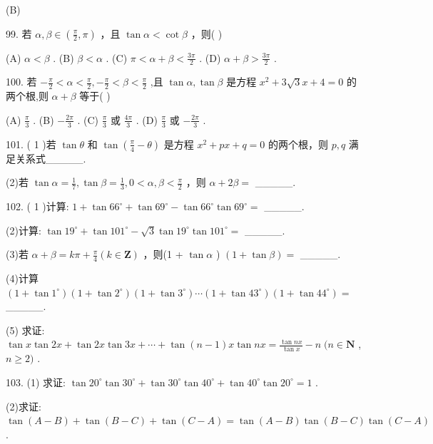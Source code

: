 \documentclass[10pt]{article}
\begin{document}
(B)

99. 若 \(\alpha ,\beta  \in  \left( {\frac{\pi }{2},\pi }\right)\) ，且 \(\tan \alpha  < \cot \beta\) ，则( )

(A) \(\alpha  < \beta\) . (B) \(\beta  < \alpha\) . (C) \(\pi  < \alpha  + \beta  < \frac{3\pi }{2}\) . (D) \(\alpha  + \beta  > \frac{3\pi }{2}\) .

100. 若 \(- \frac{\pi }{2} < \alpha  < \frac{\pi }{2}, - \frac{\pi }{2} < \beta  < \frac{\pi }{2}\) ,且 \(\tan \alpha ,\tan \beta\) 是方程 \({x}^{2} + 3\sqrt{3}x + 4 = 0\) 的两个根,则 \(\alpha  + \beta\) 等于( )

(A) \(\frac{\pi }{3}\) . (B) \(- \frac{2\pi }{3}\) . (C) \(\frac{\pi }{3}\) 或 \(\frac{4\pi }{3}\) . (D) \(\frac{\pi }{3}\) 或 \(- \frac{2\pi }{3}\) .

101. ( 1 )若 \(\tan \theta\) 和 \(\tan \left( {\frac{\pi }{4} - \theta }\right)\) 是方程 \({x}^{2} + {px} + q = 0\) 的两个根，则 \(p,q\) 满足关系式\_\_\_\_\_.

(2)若 \(\tan \alpha  = \frac{1}{7},\tan \beta  = \frac{1}{3},0 < \alpha ,\beta  < \frac{\pi }{2}\) ，则 \(\alpha  + {2\beta } =\) \_\_\_\_\_.

102. ( 1 )计算: \(1 + \tan {66}^{ \circ  } + \tan {69}^{ \circ  } - \tan {66}^{ \circ  }\tan {69}^{ \circ  } =\) \_\_\_\_\_.

(2)计算: \(\tan {19}^{ \circ  } + \tan {101}^{ \circ  } - \sqrt{3}\tan {19}^{ \circ  }\tan {101}^{ \circ  } =\) \_\_\_\_\_.

(3)若 \(\alpha  + \beta  = {k\pi } + \frac{\pi }{4}\left( {k \in  \mathbf{Z}}\right)\) ，则(1 + \(\tan \alpha\) ) \(\left( {1 + \tan \beta }\right)  =\) \_\_\_\_\_.

(4)计算 \(\left( {1 + \tan {1}^{ \circ  }}\right) \left( {1 + \tan {2}^{ \circ  }}\right) \left( {1 + \tan {3}^{ \circ  }}\right) \cdots \left( {1 + \tan {43}^{ \circ  }}\right) \left( {1 + \tan {44}^{ \circ  }}\right)  =\) \_\_\_\_\_.

(5) 求证: \(\tan x\tan {2x} + \tan {2x}\tan {3x} + \cdots  + \tan \left( {n - 1}\right) x\tan {nx} = \frac{\tan {nx}}{\tan x} - n\;(n \in  \mathbf{N}\) , \(n \geq  2)\) .

103. (1) 求证: \(\tan {20}^{ \circ  }\tan {30}^{ \circ  } + \tan {30}^{ \circ  }\tan {40}^{ \circ  } + \tan {40}^{ \circ  }\tan {20}^{ \circ  } = 1\) .

(2)求证: \(\tan \left( {A - B}\right)  + \tan \left( {B - C}\right)  + \tan \left( {C - A}\right)  = \tan \left( {A - B}\right) \tan \left( {B - C}\right) \tan \left( {C - A}\right)\) .
\end{document}
